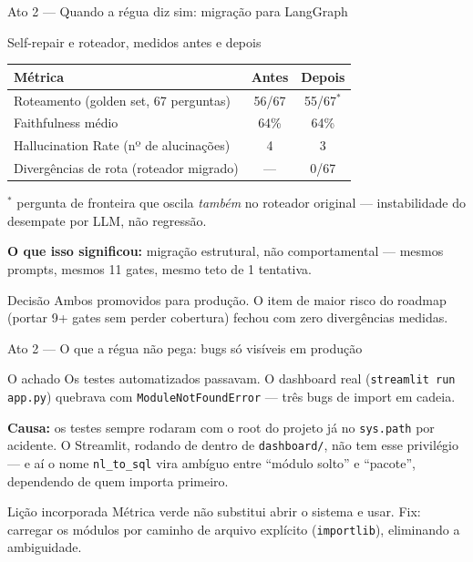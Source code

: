 \documentclass{beamer}
\newenvironment{numerobloco}[1]{\begin{block}{#1}}{\end{block}}
\newenvironment{decisaobloco}[1]{\begin{alertblock}{#1}}{\end{alertblock}}
\begin{document}
\begin{frame}{Ato 2 --- Quando a régua diz sim: migração para LangGraph}
  \small
  \begin{numerobloco}{Self-repair e roteador, medidos antes e depois}
    \begin{center}
    \begin{tabular}{lcc}
      \toprule
      \textbf{Métrica} & \textbf{Antes} & \textbf{Depois} \\
      \midrule
      Roteamento (golden set, 67 perguntas) & 56/67 & 55/67$^*$ \\
      Faithfulness médio & 64\% & 64\% \\
      Hallucination Rate (nº de alucinações) & 4 & \alert{3} \\
      Divergências de rota (roteador migrado) & --- & \alert{0/67} \\
      \bottomrule
    \end{tabular}
    \end{center}
    \footnotesize $^*$ pergunta de fronteira que oscila \emph{também} no roteador
    original --- instabilidade do desempate por LLM, não regressão.
  \end{numerobloco}

  \pause
  \textbf{O que isso significou:} migração estrutural, não comportamental --- mesmos
  prompts, mesmos 11 gates, mesmo teto de 1 tentativa.

  \pause
  \begin{decisaobloco}{Decisão}
    Ambos promovidos para produção. O item de maior risco do roadmap (portar 9+ gates
    sem perder cobertura) fechou com zero divergências medidas.
  \end{decisaobloco}
\end{frame}

\begin{frame}{Ato 2 --- O que a régua não pega: bugs só visíveis em produção}
  \small
  \begin{numerobloco}{O achado}
    Os testes automatizados passavam. O dashboard real (\texttt{streamlit run app.py})
    quebrava com \texttt{ModuleNotFoundError} --- três bugs de import em cadeia.
  \end{numerobloco}

  \pause
  \textbf{Causa:} os testes sempre rodaram com o root do projeto já no \texttt{sys.path}
  por acidente. O Streamlit, rodando de dentro de \texttt{dashboard/}, não tem esse
  privilégio --- e aí o nome \texttt{nl\_to\_sql} vira ambíguo entre ``módulo solto'' e
  ``pacote'', dependendo de quem importa primeiro.

  \pause
  \begin{decisaobloco}{Lição incorporada}
    Métrica verde não substitui abrir o sistema e usar. Fix: carregar os módulos por
    caminho de arquivo explícito (\texttt{importlib}), eliminando a ambiguidade.
  \end{decisaobloco}
\end{frame}
\end{document}

